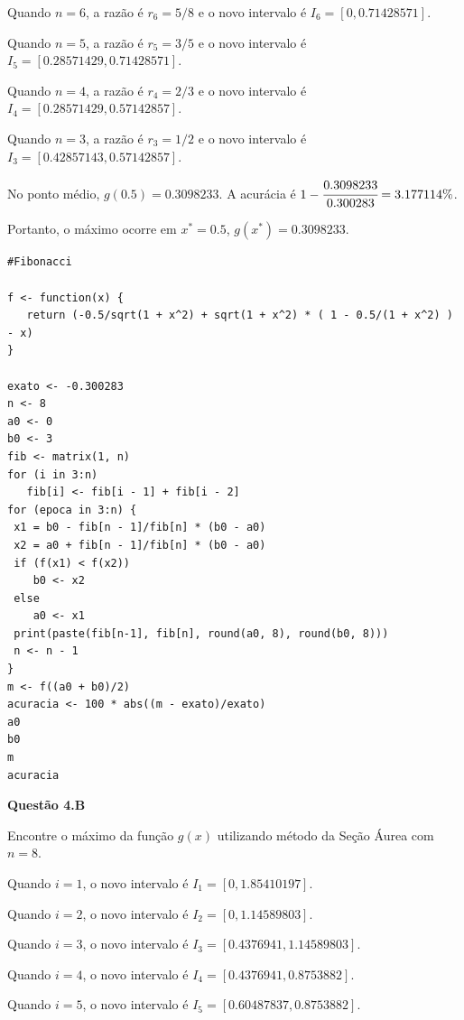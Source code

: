 \documentclass{rbfin}
\begin{document}
Quando $n = 6$, a razão é $r_6 = 5/8$ e o novo intervalo é $I_6 = [0, 0.71428571]$.

Quando $n = 5$, a razão é $r_5 = 3/5$ e o novo intervalo é $I_5 = [0.28571429, 0.71428571]$.

Quando $n = 4$, a razão é $r_4 = 2/3$ e o novo intervalo é $I_4 = [0.28571429, 0.57142857]$.

Quando $n = 3$, a razão é $r_3 = 1/2$ e o novo intervalo é $I_3 = [0.42857143, 0.57142857]$. 

No ponto médio, $g(0.5) = 0.3098233$. A acurácia é $1 - \cfrac{0.3098233}{0.300283} = 3.177114\%$.

Portanto, o máximo ocorre em $x^* = 0.5$, $g(x^*) = 0.3098233$.

\singlespacing

\begin{verbatim}
#Fibonacci

f <- function(x) {
   return (-0.5/sqrt(1 + x^2) + sqrt(1 + x^2) * ( 1 - 0.5/(1 + x^2) ) - x)
}

exato <- -0.300283
n <- 8
a0 <- 0
b0 <- 3
fib <- matrix(1, n)
for (i in 3:n)
   fib[i] <- fib[i - 1] + fib[i - 2]
for (epoca in 3:n) {
 x1 = b0 - fib[n - 1]/fib[n] * (b0 - a0)
 x2 = a0 + fib[n - 1]/fib[n] * (b0 - a0)
 if (f(x1) < f(x2))
    b0 <- x2
 else
    a0 <- x1 
 print(paste(fib[n-1], fib[n], round(a0, 8), round(b0, 8)))
 n <- n - 1
}
m <- f((a0 + b0)/2)
acuracia <- 100 * abs((m - exato)/exato)
a0
b0
m
acuracia
\end{verbatim}

\vspace{6mm}

\large

\textbf{Questão 4.B}

\normalsize

\vspace{6mm}

\doublespacing

Encontre o máximo da função $g(x)$ utilizando método da Seção Áurea com $n = 8$.

Quando $i = 1$, o novo intervalo é $I_1 = [0, 1.85410197]$.

Quando $i = 2$, o novo intervalo é $I_2 = [0, 1.14589803]$.

Quando $i = 3$, o novo intervalo é $I_3 = [0.4376941, 1.14589803]$.

Quando $i = 4$, o novo intervalo é $I_4 = [0.4376941, 0.8753882]$.

Quando $i = 5$, o novo intervalo é $I_5 = [0.60487837, 0.8753882]$.
\end{document}
